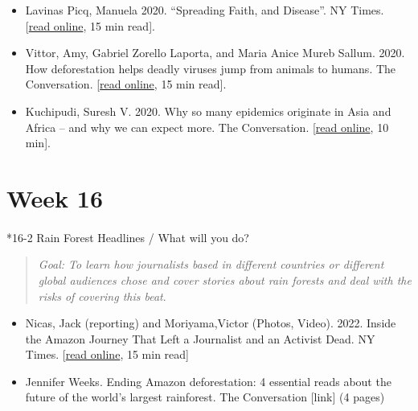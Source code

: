 \documentclass[
  10pt,
  letterpaper,
  oneside,
  open=any]{scrbook}
\makeatletter
\let\oldparagraph\paragraph
\renewcommand{\paragraph}{
    \@ifstar
      \xxxParagraphStar
      \xxxParagraphNoStar
  }
\newcommand{\xxxParagraphStar}[1]{\oldparagraph*{#1}\mbox{}}
\newcommand{\xxxParagraphNoStar}[1]{\oldparagraph{#1}\mbox{}}
\makeatother
\begin{document}
\begin{itemize}
\item
  Lavinas Picq, Manuela 2020. ``Spreading Faith, and Disease''. NY
  Times.
  {[}\href{https://www.nytimes.com/2020/10/02/opinion/amazon-missionaries-tribes-disease.html}{read
  online}, 15 min read{]}.
\item
  Vittor, Amy, Gabriel Zorello Laporta, and Maria Anice Mureb Sallum.
  2020. How deforestation helps deadly viruses jump from animals to
  humans. The Conversation.
  {[}\href{https://theconversation.com/how-deforestation-helps-deadly-viruses-jump-from-animals-to-humans-139645}{read
  online}, 15 min read{]}.
\item
  Kuchipudi, Suresh V. 2020. Why so many epidemics originate in Asia and
  Africa -- and why we can expect more. The Conversation.
  {[}\href{https://theconversation.com/why-so-many-epidemics-originate-in-asia-and-africa-and-why-we-can-expect-more-131657}{read
  online}, 10 min{]}.
\end{itemize}

\section*{Week 16}\label{week-16}


\paragraph*{16-2 Rain Forest Headlines / What will you
do?}\label{rain-forest-headlines-what-will-you-do}

\begin{quote}
\emph{Goal: To learn how journalists based in different countries or
different global audiences chose and cover stories about rain forests
and deal with the risks of covering this beat}.
\end{quote}

\begin{itemize}
\item
  Nicas, Jack (reporting) and Moriyama,Victor (Photos, Video). 2022.
  Inside the Amazon Journey That Left a Journalist and an Activist Dead.
  NY Times.
  {[}\href{https://www.nytimes.com/interactive/2022/07/11/world/americas/amazon-murder-dom-phillips-bruno-pereira.html?smid=tw-nytimes&smtyp=cur}{read
  online}, 15 min read{]}
\item
  Jennifer Weeks. Ending Amazon deforestation: 4 essential reads about
  the future of the world's largest rainforest. The Conversation
  {[}link{]} (4 pages)
\end{itemize}
\end{document}
